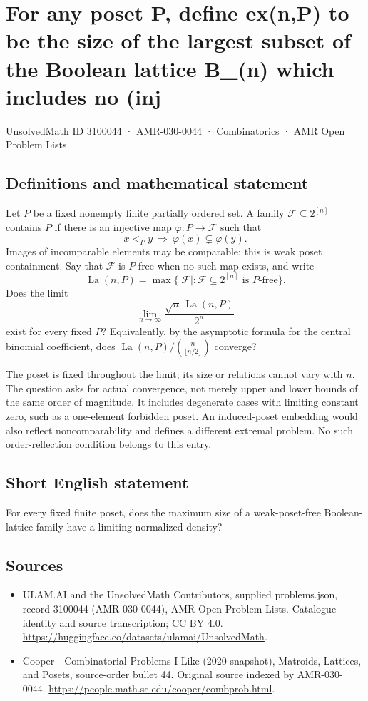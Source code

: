 \documentclass[11pt,a4paper]{article}
\begin{document}
\section*{For any poset P, define ex(n,P) to be the size of the largest subset of the Boolean lattice B\_(n) which includes no (inj}\label{3100044}
{\small UnsolvedMath ID 3100044 · AMR-030-0044 · Combinatorics · AMR Open Problem Lists}
\subsection{Definitions and mathematical statement}
Let $P$ be a fixed nonempty finite partially ordered set. A family
$\mathcal F\subseteq2^{[n]}$ contains $P$ if there is an injective
map $\varphi:P\to\mathcal F$ such that
\[
                  x<_P y\ \Longrightarrow\
                         \varphi(x)\subsetneq\varphi(y).
\]
Images of incomparable elements may be comparable; this is weak
poset containment. Say that $\mathcal F$ is $P$-free when no such
map exists, and write
\[
 \operatorname{La}(n,P)
   =\max\{|\mathcal F|:\mathcal F\subseteq2^{[n]}
                                      \text{ is }P\text{-free}\}.
\]
Does the limit
\[
                 \lim_{n\to\infty}
                    \frac{\sqrt n\,\operatorname{La}(n,P)}{2^n}
\]
exist for every fixed $P$? Equivalently, by the asymptotic formula
for the central binomial coefficient, does
$\operatorname{La}(n,P)/\binom n{\lfloor n/2\rfloor}$ converge?

The poset is fixed throughout the limit; its size or relations
cannot vary with $n$. The question asks for actual convergence,
not merely upper and lower bounds of the same order of magnitude.
It includes degenerate cases with limiting constant zero, such
as a one-element forbidden poset. An induced-poset embedding
would also reflect noncomparability and defines a different
extremal problem. No such order-reflection condition belongs to
this entry.
\subsection{Short English statement}
For every fixed finite poset, does the maximum size of a weak-poset-free Boolean-lattice family have a limiting normalized density?
\subsection{Sources}
\begin{itemize}
\item[S1] ULAM.AI and the UnsolvedMath Contributors, supplied problems.json, record 3100044 (AMR-030-0044), AMR Open Problem Lists. Catalogue identity and source transcription; CC BY 4.0.
\url{https://huggingface.co/datasets/ulamai/UnsolvedMath}.
\item[S2] Cooper - Combinatorial Problems I Like (2020 snapshot), Matroids, Lattices, and Posets, source-order bullet 44. Original source indexed by AMR-030-0044.
\url{https://people.math.sc.edu/cooper/combprob.html}.
\end{itemize}
\end{document}
